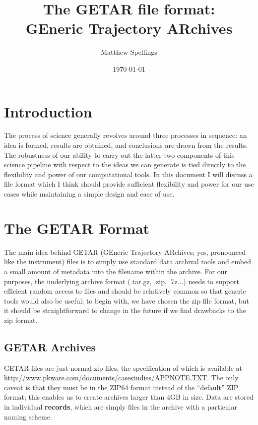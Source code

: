 \documentclass{article}
\begin{document}
\title{The GETAR file format: \\
GEneric Trajectory ARchives}
\author{Matthew Spellings}
\date{\today}

\maketitle

\section{Introduction}
The process of science generally revolves around three processes in sequence: an idea is formed, results are obtained, and conclusions are drawn from the results.
The robustness of our ability to carry out the latter two components of this science pipeline with respect to the ideas we can generate is tied directly to the flexibility and power of our computational tools.
In this document I will discuss a file format which I think should provide sufficient flexibility and power for our use cases while maintaining a simple design and ease of use.

\section{The GETAR Format}
The main idea behind GETAR (GEneric Trajectory ARchives; yes, pronounced like the instrument) files is to simply use standard data archival tools and embed a small amount of metadata into the filename within the archive.
For our purposes, the underlying archive format (.tar.gz, .zip, .7z...) needs to support efficient random access to files and should be relatively common so that generic tools would also be useful; to begin with, we have chosen the zip file format, but it should be straightforward to change in the future if we find drawbacks to the zip format.

\subsection{GETAR Archives}
GETAR files are just normal zip files, the specification of which is available at \url{http://www.pkware.com/documents/casestudies/APPNOTE.TXT}.
The only caveat is that they must be in the ZIP64 format instead of the ``default'' ZIP format; this enables us to create archives larger than 4GB in size.
Data are stored in individual \textbf{records}, which are simply files in the archive with a particular naming scheme.
\end{document}
